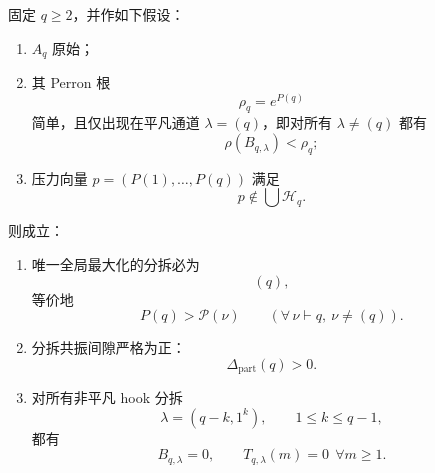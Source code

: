 \begin{theorem}\label{thm:xi-time-part63c-generic-perron-purity-kills-all-hooks}
固定 \(q\ge 2\)，并作如下假设：
\begin{enumerate}
  \item \(A_q\) 原始；
  \item 其 Perron 根
  \[
  \rho_q=e^{P(q)}
  \]
  简单，且仅出现在平凡通道 \(\lambda=(q)\)，即对所有 \(\lambda\neq(q)\) 都有
  \[
  \rho(B_{q,\lambda})<\rho_q;
  \]
  \item 压力向量 \(p=(P(1),\dots,P(q))\) 满足
  \[
  p\notin \bigcup\mathcal H_q.
  \]
\end{enumerate}
则成立：
\begin{enumerate}
  \item 唯一全局最大化的分拆必为
  \[
  (q),
  \]
  等价地
  \[
  \boxed{\;
  P(q)>\mathcal P(\nu)\qquad(\forall\,\nu\vdash q,\ \nu\neq(q)).\;}
  \]
  \item 分拆共振间隙严格为正：
  \[
  \boxed{\;
  \Delta_{\mathrm{part}}(q)>0.\;}
  \]
  \item 对所有非平凡 hook 分拆
  \[
  \lambda=(q-k,1^k),
  \qquad
  1\le k\le q-1,
  \]
  都有
  \[
  \boxed{\;
  B_{q,\lambda}=0,
  \qquad
  T_{q,\lambda}(m)=0\ \ \forall m\ge 1.\;}
  \]
\end{enumerate}
\end{theorem}
